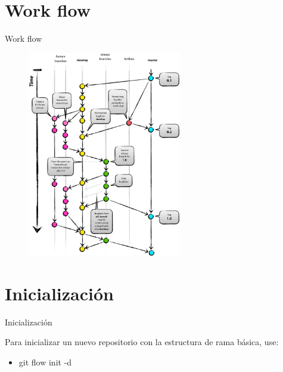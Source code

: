 \documentclass{beamer}
\begin{document}
\section{Work flow}
\begin{frame}{Work flow}

\begin{figure}[H]
\centering
\includegraphics[width=0.6\textwidth]{git-flow.png}
\caption{\label{fig:Figura2} }
\end{figure}

\end{frame}

\section{Inicialización}
\begin{frame}{Inicialización}

Para inicializar un nuevo repositorio con la estructura de rama básica, use:

\begin{itemize}
\item git flow init -d
\end{itemize}

\end{frame}
\end{document}
